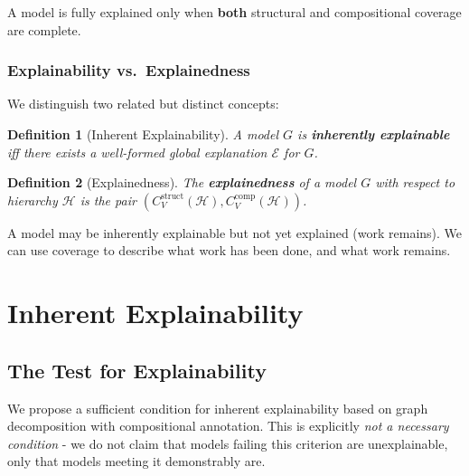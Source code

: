 \documentclass{article}
\newtheorem{definition}{Definition}
\begin{document}
A model is fully explained only when \textbf{both} structural and compositional coverage are complete.

\subsubsection{Explainability vs.\ Explainedness}

We distinguish two related but distinct concepts:

\begin{definition}[Inherent Explainability]
A model $G$ is \textbf{inherently explainable} iff there exists a well-formed global explanation $\mathcal{E}$ for $G$.
\end{definition}

\begin{definition}[Explainedness]
The \textbf{explainedness} of a model $G$ with respect to hierarchy $\mathcal{H}$ is the pair $(C_V^{\text{struct}}(\mathcal{H}), C_V^{\text{comp}}(\mathcal{H}))$.
\end{definition}

A model may be inherently explainable but not yet explained (work remains). We can use coverage to describe what work has been done, and what work remains.

\section{Inherent Explainability}

\subsection{The Test for Explainability}

We propose a sufficient condition for inherent explainability based on graph decomposition with compositional annotation. This is explicitly \textit{not a necessary condition} - we do not claim that models failing this criterion are unexplainable, only that models meeting it demonstrably are.
\end{document}

